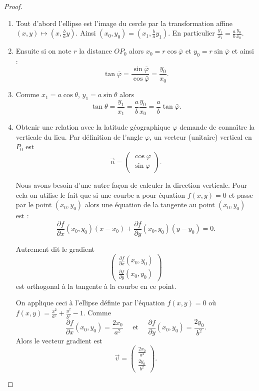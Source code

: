 \documentclass[class=report,crop=false]{standalone}
\newcommand{\vect}{\overrightarrow}
\begin{document}
\begin{proof}
\begin{enumerate}
  \item Tout d'abord l'ellipse est l'image du cercle par la transformation affine 
  $(x,y) \mapsto (x,\frac{b}{a}y)$. Ainsi
  $(x_0,y_0) = (x_1,\frac{b}{a}y_1)$. En particulier 
  $\frac{y_1}{x_1}= \frac{a}{b}\frac{y_0}{x_0}$.


  \item Ensuite si on note $r$ la distance $OP_0$ alors
  $x_0 = r \cos \bar\varphi$ et $y_0 = r \sin \bar\varphi$ et ainsi :
  $$\tan \bar\varphi 
  = \frac{\sin \bar\varphi}{\cos \bar\varphi} 
  = \frac{y_0}{x_0}
  .$$
  
  \item Comme $x_1 = a \cos \theta$, $y_1 = a \sin \theta$ alors
  $$\tan \theta 
  = \frac{y_1}{x_1} 
  = \frac{a}{b}\frac{y_0}{x_0}
  = \frac{a}{b} \tan \bar\varphi.$$
  
  \item Obtenir une relation avec la latitude géographique $\varphi$ demande
  de connaître la verticale du lieu. Par définition de l'angle $\varphi$, 
  un vecteur (unitaire) vertical en $P_0$ est 
  $$ \vect{u} = \begin{pmatrix}\cos \varphi \\ \sin \varphi \end{pmatrix}.$$
  
  Nous avons besoin d'une autre façon de calculer la direction verticale.
  Pour cela on utilise le fait que si une courbe a pour équation
  $f(x,y)=0$ et passe par le point $(x_0,y_0)$ alors 
  une équation de la tangente au point $(x_0,y_0)$ est :
  $$\frac{\partial f}{\partial x}(x_0,y_0) (x-x_0) + \frac{\partial f}{\partial y}(x_0,y_0)(y-y_0) = 0.$$
  
  
  Autrement dit le gradient 
  $$\begin{pmatrix} \frac{\partial f}{\partial x}(x_0,y_0) \\ \frac{\partial f}{\partial y}(x_0,y_0) \end{pmatrix}$$
  est orthogonal à la tangente à la courbe en ce point.

  On applique ceci à l'ellipse définie par l'équation $f(x,y)=0$ où 
  $f(x,y) = \frac{x^2}{a^2}+\frac{y^2}{b^2} - 1$.
  Comme 
  $$\frac{\partial f}{\partial x}(x_0,y_0) = \frac{2x_0}{a^2}
  \quad \text{ et } \quad \frac{\partial f}{\partial y}(x_0,y_0) = \frac{2y_0}{b^2}.$$
  Alors le vecteur gradient est 
  $$\vect v = \begin{pmatrix}\frac{2x_0}{a^2} \\ \frac{2y_0}{b^2} \end{pmatrix}.$$
  


\end{enumerate}
\end{proof}
\end{document}
